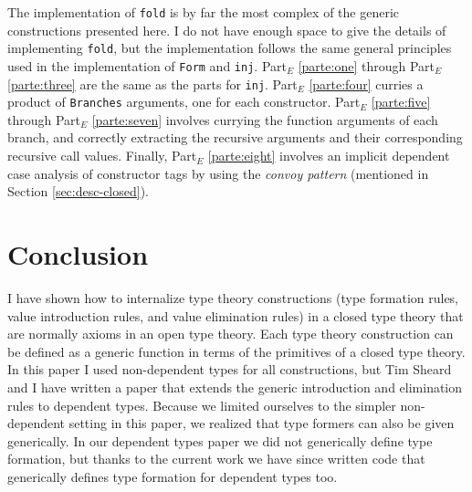 \documentclass[runningheads,a4paper]{llncs}
\newcommand{\refsec}[1]{Section \ref{sec:#1}}
\newcommand{\refparte}[1]{Part$_E$ \ref{parte:#1}}
\begin{document}
The implementation of {\tt fold} is by far the most complex of the
generic constructions presented here. I do not have enough space to
give the details of implementing {\tt fold}, but the implementation follows
the same general principles used in the implementation of
{\tt Form} and {\tt inj}. \refparte{one} through \refparte{three} are
the same as the parts for {\tt inj}. \refparte{four} curries a product
of {\tt Branches} arguments, one for each constructor.
\refparte{five} through \refparte{seven} involves currying the
function arguments of each branch, and correctly extracting the
recursive arguments and their corresponding recursive call values.
Finally, \refparte{eight} involves an implicit dependent case
analysis of constructor tags by using the {\it convoy pattern}
(mentioned in \refsec{desc-closed}).

\section{Conclusion}

I have shown how to internalize type theory constructions (type
formation rules, value introduction rules, and value elimination
rules) in a closed type theory that are normally axioms in an open
type theory. Each type theory construction can be defined as a generic
function in terms of the primitives of a closed type theory. In this
paper I used non-dependent types for all constructions, but Tim Sheard
and I have written a paper that extends the generic introduction and
elimination rules to dependent types. Because we limited ourselves to
the simpler non-dependent setting in this paper, we realized that type
formers can also be given generically. In our dependent types paper
we did not generically define type formation, but
thanks to the current work we have since written code that generically defines
type formation for dependent types too.



\end{document}

